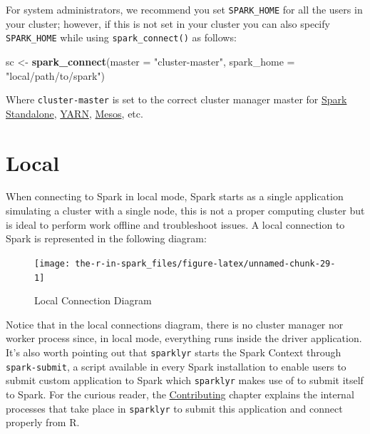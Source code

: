\documentclass[]{book}
\newenvironment{Shaded}{\begin{snugshade}}{\end{snugshade}}
\newcommand{\DataTypeTok}[1]{\textcolor[rgb]{0.13,0.29,0.53}{#1}}
\newcommand{\KeywordTok}[1]{\textcolor[rgb]{0.13,0.29,0.53}{\textbf{#1}}}
\newcommand{\NormalTok}[1]{#1}
\newcommand{\StringTok}[1]{\textcolor[rgb]{0.31,0.60,0.02}{#1}}
\theoremstyle{definition}
\theoremstyle{definition}
\theoremstyle{definition}
\theoremstyle{remark}
\begin{document}
For system administrators, we recommend you set \texttt{SPARK\_HOME} for
all the users in your cluster; however, if this is not set in your
cluster you can also specify \texttt{SPARK\_HOME} while using
\texttt{spark\_connect()} as follows:

\begin{Shaded}
\begin{Highlighting}[]
\NormalTok{sc <-}\StringTok{ }\KeywordTok{spark_connect}\NormalTok{(}\DataTypeTok{master =} \StringTok{"cluster-master"}\NormalTok{, }\DataTypeTok{spark_home =} \StringTok{"local/path/to/spark"}\NormalTok{)}
\end{Highlighting}
\end{Shaded}

Where \texttt{cluster-master} is set to the correct cluster manager
master for \href{Standalone}{Spark Standalone}, \href{Yarn}{YARN},
\protect\hyperlink{mesos-1}{Mesos}, etc.

\hypertarget{local}{%
\section{Local}\label{local}}

When connecting to Spark in local mode, Spark starts as a single
application simulating a cluster with a single node, this is not a
proper computing cluster but is ideal to perform work offline and
troubleshoot issues. A local connection to Spark is represented in the
following diagram:

\begin{figure}

{\centering \texttt{[image: the-r-in-spark\_files/figure-latex/unnamed-chunk-29-1]} 

}

\caption{Local Connection Diagram}\label{fig:unnamed-chunk-29}
\end{figure}

Notice that in the local connections diagram, there is no cluster
manager nor worker process since, in local mode, everything runs inside
the driver application. It's also worth pointing out that
\texttt{sparklyr} starts the Spark Context through
\texttt{spark-submit}, a script available in every Spark installation to
enable users to submit custom application to Spark which
\texttt{sparklyr} makes use of to submit itself to Spark. For the
curious reader, the \protect\hyperlink{contributing}{Contributing}
chapter explains the internal processes that take place in
\texttt{sparklyr} to submit this application and connect properly from
R.
\end{document}

